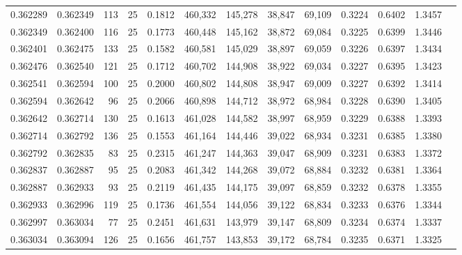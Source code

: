 \begin{tabular}{rrrrrrrrrrrrr}
0.362289 & 0.362349 &   113 &  25 &                                     0.1812 & 460,332 & 145,278 &  38,847 &  69,109 & 0.3224 & 0.6402 & 1.3457 \\
0.362349 & 0.362400 &   116 &  25 &                                     0.1773 & 460,448 & 145,162 &  38,872 &  69,084 & 0.3225 & 0.6399 & 1.3446 \\
0.362401 & 0.362475 &   133 &  25 &                                     0.1582 & 460,581 & 145,029 &  38,897 &  69,059 & 0.3226 & 0.6397 & 1.3434 \\
0.362476 & 0.362540 &   121 &  25 &                                     0.1712 & 460,702 & 144,908 &  38,922 &  69,034 & 0.3227 & 0.6395 & 1.3423 \\
0.362541 & 0.362594 &   100 &  25 &                                     0.2000 & 460,802 & 144,808 &  38,947 &  69,009 & 0.3227 & 0.6392 & 1.3414 \\
0.362594 & 0.362642 &    96 &  25 &                                     0.2066 & 460,898 & 144,712 &  38,972 &  68,984 & 0.3228 & 0.6390 & 1.3405 \\
0.362642 & 0.362714 &   130 &  25 &                                     0.1613 & 461,028 & 144,582 &  38,997 &  68,959 & 0.3229 & 0.6388 & 1.3393 \\
0.362714 & 0.362792 &   136 &  25 &                                     0.1553 & 461,164 & 144,446 &  39,022 &  68,934 & 0.3231 & 0.6385 & 1.3380 \\
0.362792 & 0.362835 &    83 &  25 &                                     0.2315 & 461,247 & 144,363 &  39,047 &  68,909 & 0.3231 & 0.6383 & 1.3372 \\
0.362837 & 0.362887 &    95 &  25 &                                     0.2083 & 461,342 & 144,268 &  39,072 &  68,884 & 0.3232 & 0.6381 & 1.3364 \\
0.362887 & 0.362933 &    93 &  25 &                                     0.2119 & 461,435 & 144,175 &  39,097 &  68,859 & 0.3232 & 0.6378 & 1.3355 \\
0.362933 & 0.362996 &   119 &  25 &                                     0.1736 & 461,554 & 144,056 &  39,122 &  68,834 & 0.3233 & 0.6376 & 1.3344 \\
0.362997 & 0.363034 &    77 &  25 &                                     0.2451 & 461,631 & 143,979 &  39,147 &  68,809 & 0.3234 & 0.6374 & 1.3337 \\
0.363034 & 0.363094 &   126 &  25 &                                     0.1656 & 461,757 & 143,853 &  39,172 &  68,784 & 0.3235 & 0.6371 & 1.3325 \\

\end{tabular}
